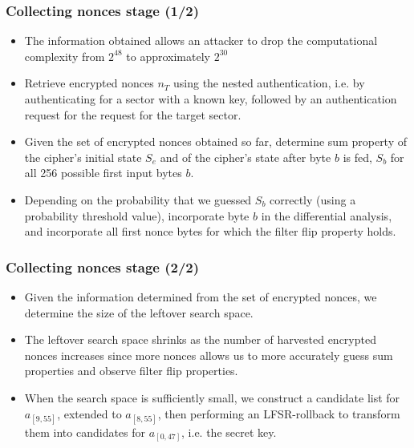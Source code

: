 \documentclass[12pt]{beamer}
\begin{document}
\begin{frame}
\frametitle{Collecting nonces stage (1/2)}
\begin{itemize}
	\item The information obtained allows an attacker to drop the computational complexity from $2^{48}$ to approximately $2^{30}$
	\item Retrieve encrypted nonces $n_T$ using the nested authentication, i.e. by authenticating for a sector with a known key, followed by an authentication request for the request for the target sector.
	\item Given the set of encrypted nonces obtained so far, determine sum property of the cipher's initial state $S_e$ and of the cipher's state after byte $b$ is fed, $S_b$ for all 256 possible first input bytes $b$.
	\item Depending on the probability that we guessed $S_b$ correctly (using a probability threshold value), incorporate byte $b$ in the differential analysis, and incorporate all first nonce bytes for which the filter flip property holds.
\end{itemize}
\end{frame}

\begin{frame}
\frametitle{Collecting nonces stage (2/2)}
\begin{itemize}
	\item Given the information determined from the set of encrypted nonces, we determine the size of the leftover search space.
	\item The leftover search space shrinks as the number of harvested encrypted nonces increases since more nonces allows us to more accurately guess sum properties and observe filter flip properties.
	\item When the search space is sufficiently small, we construct a candidate list for $a_{[9,55]}$, extended to $a_{[8,55]}$, then performing an LFSR-rollback to transform them into candidates for $a_{[0,47]}$, i.e. the secret key.
\end{itemize}
\end{frame}
\end{document}
